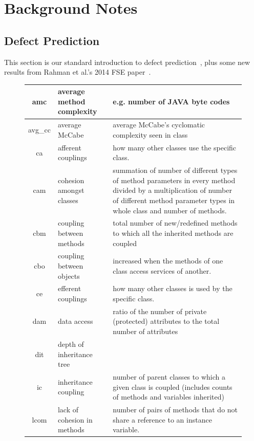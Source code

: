 \documentclass{sig-alternative}
\def\baselinestretch{1}
\begin{document}
\section{Background Notes}
 

\subsection{Defect Prediction}


This section is our standard introduction to defect prediction~\cite{me15:book1},
plus   some new results from Rahman et al.'s   2014 FSE paper~\cite{rahman14:icse}. 
 


\begin{figure}[!t]
\renewcommand{\baselinestretch}{0.8}\begin{center}
{\scriptsize
\begin{tabular}{c|l|p{4.7in}}
amc & average method complexity & e.g. number of JAVA byte codes\\\hline
avg\_cc & average McCabe & average McCabe's cyclomatic complexity seen
in class\\\hline
ca & afferent couplings & how many other classes use the specific
class. \\\hline
cam & cohesion amongst classes & summation of number of different
types of method parameters in every method divided by a multiplication
of number of different method parameter types in whole class and
number of methods. \\\hline
cbm &coupling between methods &  total number of new/redefined methods
to which all the inherited methods are coupled\\\hline
cbo & coupling between objects & increased when the methods of one
class access services of another.\\\hline
ce & efferent couplings & how many other classes is used by the
specific class. \\\hline
dam & data access & ratio of the number of private (protected)
attributes to the total number of attributes\\\hline
dit & depth of inheritance tree &\\\hline
ic & inheritance coupling &  number of parent classes to which a given
class is coupled (includes counts of methods and variables inherited)
\\\hline
lcom & lack of cohesion in methods &number of pairs of methods that do
not share a reference to an instance variable.\\\hline

\end{tabular}}
\end{center}
\end{figure}
\end{document}
